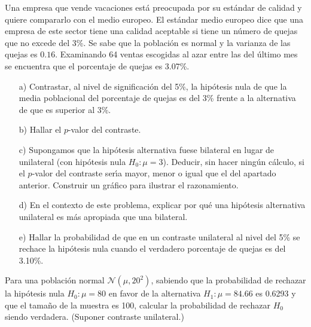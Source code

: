 \begin{prob}%
    Una empresa que vende vacaciones est\'{a} preocupada por su est\'{a}ndar
    de calidad y quiere compararlo con el medio europeo. El est\'{a}ndar
    medio europeo dice que una empresa de este sector tiene una calidad
    aceptable si tiene un n\'{u}mero de quejas que no excede del 3\%. Se sabe
    que la poblaci\'on es normal y la varianza de las quejas es $0.16$.
    Examinando 64 ventas escogidas al azar entre las del \'{u}ltimo mes
    se encuentra que el porcentaje de quejas es 3.07\%.
    \begin{itemize}
    \item [a)] Contrastar, al nivel de significaci\'{o}n del 5\%, la
    hip\'otesis nula de que la media poblacional del porcentaje de quejas
    es del 3\% frente a la alternativa de que es superior al 3\%.

    \item [b)] Hallar el $p$-valor del contraste.

    \item [c)] Supongamos que la hip\'{o}tesis alternativa fuese
    bilateral en lugar de unilateral (con hip\'otesis nula $H_{0}:
    \mu = 3$). Deducir, sin hacer ning\'un c\'{a}lculo, si el $p$-valor
    del contraste ser\'{\i}a ma\-yor, menor o igual que el del apartado
    anterior. Construir un gr\'{a}fico para ilustrar el razonamiento.

    \item [d)] En el contexto de este problema, explicar por qu\'e una
    hip\'{o}tesis alternativa unilateral es m\'{a}s apropiada que una
    bilateral.

    \item [e)] Hallar la probabilidad de que en un contraste unilateral
    al nivel del 5\% se rechace la hip\'{o}tesis nula cuando el
    verdadero porcentaje de quejas es del 3.10\%.
    \end{itemize}
\end{prob}

\begin{prob}%
    Para una poblaci\'on normal $\mathcal{N}(\mu, 20^2)$, sabiendo que
    la probabilidad de rechazar la hip\'otesis nula $H_{0}: \mu = 80$
    en favor de la alternativa $H_{1}: \mu = 84.66$ es
    0.6293 y que el tama\~no de la muestra es 100, calcular la
    probabilidad de rechazar $H_{0}$ siendo verdadera. (Suponer contraste
    unilateral.)
\end{prob}

